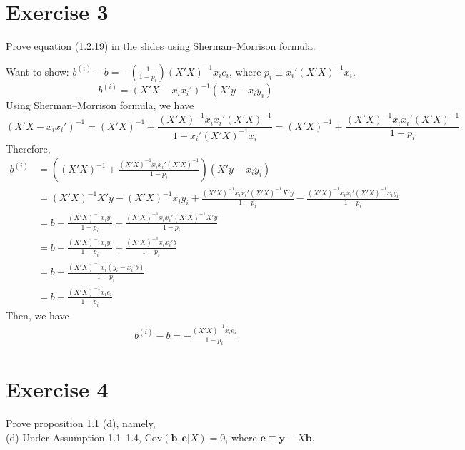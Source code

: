 \documentclass[12pt, letterpaper, onecolumn]{exam}
\begin{document}
\section*{Exercise 3}
Prove equation (1.2.19) in the slides using Sherman–Morrison formula.
\begin{solution}
    Want to show: $b^{(i)}- b = -(\frac{1}{1-p_{i}}) (X'X)^{-1}x_{i}e_{i}$, where
    $p_{i}\equiv x_{i}'(X'X)^{-1}x_{i}$.
    \[
        b^{(i)}= (X'X - x_{i}x_{i}')^{-1}(X'y - x_{i}y_{i})
    \]
    Using Sherman–Morrison formula, we have
    \[
        (X'X - x_{i}x_{i}')^{-1}= (X'X)^{-1}+ \frac{(X'X)^{-1}x_{i}x_{i}'(X'X)^{-1}}{1
        - x_{i}'(X'X)^{-1}x_{i}}= (X'X)^{-1}+ \frac{(X'X)^{-1}x_{i}x_{i}'(X'X)^{-1}}{1
        - p_{i}}
    \]
    Therefore,
    \begin{align*}
        b^{(i)} & = \left((X'X)^{-1}+ \frac{(X'X)^{-1}x_{i}x_{i}'(X'X)^{-1}}{1 - p_{i}}\right)(X'y - x_{i}y_{i})                                                            \\
                & = (X'X)^{-1}X'y - (X'X)^{-1}x_{i}y_{i}+ \frac{(X'X)^{-1}x_{i}x_{i}'(X'X)^{-1}X'y}{1 - p_{i}}- \frac{(X'X)^{-1}x_{i}x_{i}'(X'X)^{-1}x_{i}y_{i}}{1 - p_{i}} \\
                & = b - \frac{(X'X)^{-1}x_{i}y_{i}}{1-p_{i}}+ \frac{(X'X)^{-1}x_{i}x_{i}'(X'X)^{-1}X'y}{1 - p_{i}}                                                          \\
                & = b - \frac{(X'X)^{-1}x_{i}y_{i}}{1-p_{i}}+ \frac{(X'X)^{-1}x_{i}x_{i}'b}{1 - p_{i}}                                                                      \\
                & = b - \frac{(X'X)^{-1}x_{i}(y_{i}- x_{i}'b)}{1 - p_{i}}                                                                                                   \\
                & = b - \frac{(X'X)^{-1}x_{i}e_{i}}{1 - p_{i}}
    \end{align*}
    Then, we have
    \begin{align*}
        b^{(i)}- b = -\frac{(X'X)^{-1}x_{i}e_{i}}{1 - p_{i}}
    \end{align*}
\end{solution}

\section*{Exercise 4}
Prove proposition 1.1 (d), namely,\\
(d) Under Assumption 1.1--1.4, $\text{Cov}(\mathbf{b}, \mathbf{e}|X) = 0$, where
$\mathbf{e}\equiv \mathbf{y}- X\mathbf{b}$.
\end{document}
